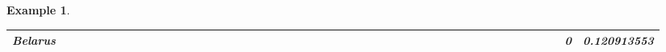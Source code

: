 \documentclass[a4paper,11pt]{report}
\newtheorem{example}[theorem]{Example}
\begin{document}
\begin{example}
\begin{appendices}
\begin{landscape}
\begin{longtable}{r|r|r|r|r|r|r|r|r|r|r|r|r|r|r|r|r|r|r|r|r|r|r|r|r|r|r|r|r|r|r|r|r|r|r|r|r|r|r|r|r|r|r|r|r|r|r|}
\multicolumn{1}{|r|}{\textbf{Belarus}}               &                                       &                                       &                                          &                                       &                                       &                                                     &                                        &                                       &                                      &                                       &                                       &                                                &                                       &                                      &                                       &                                       &                                      &                                       &                                       &                                       &                                      &                                     &                                      &                                         &                                     &                                       &                                          &                                      &                                        &                                       &                                      &                                          &                                      &                                        &                                        &                                     &                                      &                                           &                                               &                                      &                                       &                                              &                                      &                                     & 0                                             & 0.120913553                             \\ \hline

\end{longtable}
\end{landscape}
\end{appendices}
\end{example}
\end{document}
